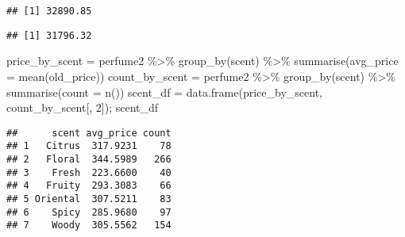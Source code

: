 \documentclass[
]{article}
\newenvironment{Shaded}{\begin{snugshade}}{\end{snugshade}}
\newcommand{\AttributeTok}[1]{\textcolor[rgb]{0.77,0.63,0.00}{#1}}
\newcommand{\DecValTok}[1]{\textcolor[rgb]{0.00,0.00,0.81}{#1}}
\newcommand{\FunctionTok}[1]{\textcolor[rgb]{0.00,0.00,0.00}{#1}}
\newcommand{\NormalTok}[1]{#1}
\newcommand{\OtherTok}[1]{\textcolor[rgb]{0.56,0.35,0.01}{#1}}
\newcommand{\SpecialCharTok}[1]{\textcolor[rgb]{0.00,0.00,0.00}{#1}}
\begin{document}
\begin{verbatim}
## [1] 32890.85
\end{verbatim}

\begin{Shaded}
\end{Shaded}

\begin{verbatim}
## [1] 31796.32
\end{verbatim}

\begin{Shaded}
\begin{Highlighting}[]
\NormalTok{price\_by\_scent }\OtherTok{=}\NormalTok{ perfume2 }\SpecialCharTok{\%\textgreater{}\%}
  \FunctionTok{group\_by}\NormalTok{(scent) }\SpecialCharTok{\%\textgreater{}\%}
  \FunctionTok{summarise}\NormalTok{(}\AttributeTok{avg\_price =} \FunctionTok{mean}\NormalTok{(old\_price))}
\NormalTok{count\_by\_scent }\OtherTok{=}\NormalTok{ perfume2 }\SpecialCharTok{\%\textgreater{}\%}
  \FunctionTok{group\_by}\NormalTok{(scent) }\SpecialCharTok{\%\textgreater{}\%}
  \FunctionTok{summarise}\NormalTok{(}\AttributeTok{count =} \FunctionTok{n}\NormalTok{())}
\NormalTok{scent\_df }\OtherTok{=} \FunctionTok{data.frame}\NormalTok{(price\_by\_scent, count\_by\_scent[, }\DecValTok{2}\NormalTok{]); scent\_df}
\end{Highlighting}
\end{Shaded}

\begin{verbatim}
##      scent avg_price count
## 1   Citrus  317.9231    78
## 2   Floral  344.5989   266
## 3    Fresh  223.6600    40
## 4   Fruity  293.3083    66
## 5 Oriental  307.5211    83
## 6    Spicy  285.9680    97
## 7    Woody  305.5562   154
\end{verbatim}
\end{document}
